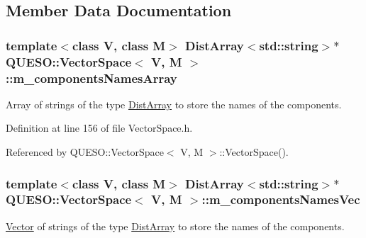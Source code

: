 \subsection{Member Data Documentation}
\hypertarget{class_q_u_e_s_o_1_1_vector_space_a6bcd9c13374cda32f043a93e171aeabf}{
\subsubsection[{m\-\_\-components\-Names\-Array}]{\setlength{\rightskip}{0pt plus 5cm}template$<$class V, class M$>$ {\bf Dist\-Array}$<$std\-::string$>$$\ast$ {\bf Q\-U\-E\-S\-O\-::\-Vector\-Space}$<$ V, M $>$\-::m\-\_\-components\-Names\-Array\hspace{0.3cm}{\ttfamily [protected]}}}\label{class_q_u_e_s_o_1_1_vector_space_a6bcd9c13374cda32f043a93e171aeabf}


Array of strings of the type \hyperlink{class_q_u_e_s_o_1_1_dist_array}{Dist\-Array} to store the names of the components. 



Definition at line 156 of file Vector\-Space.\-h.



Referenced by Q\-U\-E\-S\-O\-::\-Vector\-Space$<$ V, M $>$\-::\-Vector\-Space().

\hypertarget{class_q_u_e_s_o_1_1_vector_space_a28b5617b4b30cea1e02e4cb01fd067d8}{
\subsubsection[{m\-\_\-components\-Names\-Vec}]{\setlength{\rightskip}{0pt plus 5cm}template$<$class V, class M$>$ {\bf Dist\-Array}$<$std\-::string$>$$\ast$ {\bf Q\-U\-E\-S\-O\-::\-Vector\-Space}$<$ V, M $>$\-::m\-\_\-components\-Names\-Vec\hspace{0.3cm}{\ttfamily [protected]}}}\label{class_q_u_e_s_o_1_1_vector_space_a28b5617b4b30cea1e02e4cb01fd067d8}


\hyperlink{class_q_u_e_s_o_1_1_vector}{Vector} of strings of the type \hyperlink{class_q_u_e_s_o_1_1_dist_array}{Dist\-Array} to store the names of the components. 



